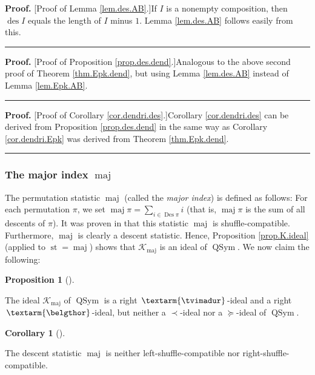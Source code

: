 \documentclass[numbers=enddot,12pt,final,onecolumn,notitlepage]{scrartcl}%
\theoremstyle{definition}
\newtheorem{prop}[theo]{Proposition}
\newenvironment{proposition}[1][]
{\begin{prop}[#1]\begin{leftbar}}
{\end{leftbar}\end{prop}}
\newtheorem{coro}[theo]{Corollary}
\newenvironment{corollary}[1][]
{\begin{coro}[#1]\begin{leftbar}}
{\end{leftbar}\end{coro}}
\newenvironment{proof}[1][Proof]{\noindent\textbf{#1.} }{\ \rule{0.5em}{0.5em}}
\newenvironment{verlong}{}{}
\newcommand{\tvi}{\left. \textarm{\tvimadur} \right.}
\newcommand{\bel}{\left. \textarm{\belgthor} \right.}
\let\sumnonlimits\sum
\renewcommand{\sum}{\sumnonlimits\limits}
\begin{document}
\begin{verlong}
\begin{proof}
[Proof of Lemma \ref{lem.des.AB}.]If $I$ is a nonempty composition, then
$\operatorname*{des}I$ equals the length of $I$ minus $1$. Lemma
\ref{lem.des.AB} follows easily from this.
\end{proof}

\begin{proof}
[Proof of Proposition \ref{prop.des.dend}.]Analogous to the above second proof
of Theorem \ref{thm.Epk.dend}, but using Lemma \ref{lem.des.AB} instead of
Lemma \ref{lem.Epk.AB}.
\end{proof}

\begin{proof}
[Proof of Corollary \ref{cor.dendri.des}.]Corollary \ref{cor.dendri.des} can
be derived from Proposition \ref{prop.des.dend} in the same way as Corollary
\ref{cor.dendri.Epk} was derived from Theorem \ref{thm.Epk.dend}.
\end{proof}

\subsubsection{The major index $\operatorname*{maj}$}

The permutation statistic $\operatorname*{maj}$ (called the \textit{major
index}) is defined as follows: For each permutation $\pi$, we set
$\operatorname*{maj}\pi=\sum_{i\in\operatorname*{Des}\pi}i$ (that is,
$\operatorname*{maj}\pi$ is the sum of all descents of $\pi$). It was proven
in \cite[Theorem 3.1 \textbf{(a)}]{part1} that this statistic
$\operatorname*{maj}$ is shuffle-compatible. Furthermore, $\operatorname*{maj}%
$ is clearly a descent statistic. Hence, Proposition \ref{prop.K.ideal}
(applied to $\operatorname*{st}=\operatorname*{maj}$) shows that
$\mathcal{K}_{\operatorname*{maj}}$ is an ideal of $\operatorname*{QSym}$. We
now claim the following:

\begin{proposition}
\label{prop.maj.dend}The ideal $\mathcal{K}_{\operatorname*{maj}}$ of
$\operatorname*{QSym}$ is a right $\tvi$-ideal and a right $\bel$-ideal, but
neither a $\left.  \prec\right.  $-ideal nor a $\left.  \succeq\right.
$-ideal of $\operatorname*{QSym}$.
\end{proposition}

\begin{corollary}
\label{cor.dendri.maj}The descent statistic $\operatorname*{maj}$ is neither
left-shuffle-compatible nor right-shuffle-compatible.
\end{corollary}


\end{verlong}
\end{document}
